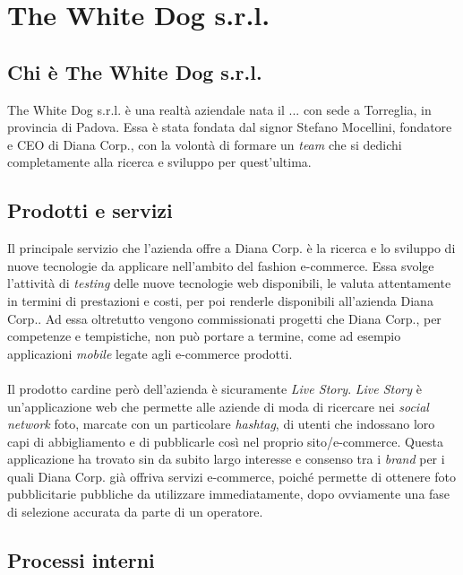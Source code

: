 \newpage
\chapter{The White Dog s.r.l.}
\label{cap:thewhitedog}

\section{Chi è The White Dog s.r.l.}

The White Dog s.r.l. è una realtà aziendale nata il ... con sede a Torreglia, in provincia di Padova. Essa è stata fondata dal signor Stefano Mocellini, fondatore e CEO di Diana Corp., con la volontà di formare un \textit{team} che si dedichi completamente alla ricerca e sviluppo per quest'ultima.

\section{Prodotti e servizi}

Il principale servizio che l'azienda offre a Diana Corp. è la ricerca e lo sviluppo di nuove tecnologie da applicare nell'ambito del fashion e-commerce. Essa svolge l'attività di \textit{testing} delle nuove tecnologie web disponibili, le valuta attentamente in termini di prestazioni e costi, per poi renderle disponibili all'azienda Diana Corp.. Ad essa oltretutto vengono commissionati progetti che Diana Corp., per competenze e tempistiche, non può portare a termine, come ad esempio applicazioni \textit{mobile} legate agli e-commerce prodotti. \\ \\
Il prodotto cardine però dell'azienda è sicuramente \textit{Live Story}. \textit{Live Story} è un'applicazione web che permette alle aziende di moda di ricercare nei \textit{social network} foto, marcate con un particolare \textit{hashtag}, di utenti che indossano loro capi di abbigliamento e di pubblicarle così nel proprio sito/e-commerce. Questa applicazione ha trovato sin da subito largo interesse e consenso tra i \textit{brand} per i quali Diana Corp. già offriva servizi e-commerce, poiché permette di ottenere foto pubblicitarie pubbliche da utilizzare immediatamente, dopo ovviamente una fase di selezione accurata da parte di un operatore.

\section{Processi interni}

